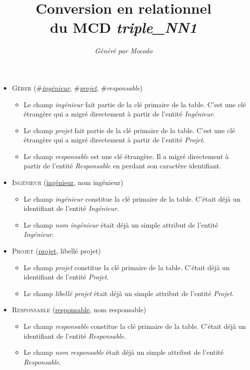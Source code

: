 \documentclass[a4paper]{article}
\title{Conversion en relationnel\\du MCD \emph{triple_NN1}}
\author{\emph{Généré par Mocodo}}
\newcommand{\relat}[1]{\textsc{#1}}
\newcommand{\attr}[1]{#1}
\newcommand{\prim}[1]{\uline{#1}}
\newcommand{\foreign}[1]{\#\textsl{#1}}
\begin{document}
\maketitle

\begin{itemize}
  \item \relat{Gérer} (\foreign{\prim{ingénieur}}, \foreign{\prim{projet}}, \foreign{responsable})
  \begin{itemize}
    \item Le champ \emph{ingénieur} fait partie de la clé primaire de la table. C'est une clé étrangère qui a migré directement à partir de l'entité \emph{Ingénieur}.
    \item Le champ \emph{projet} fait partie de la clé primaire de la table. C'est une clé étrangère qui a migré directement à partir de l'entité \emph{Projet}.
    \item Le champ \emph{responsable} est une clé étrangère. Il a migré directement à partir de l'entité \emph{Responsable} en perdant son caractère identifiant.
  \end{itemize}

  \item \relat{Ingénieur} (\prim{ingénieur}, \attr{nom ingénieur})
  \begin{itemize}
    \item Le champ \emph{ingénieur} constitue la clé primaire de la table. C'était déjà un identifiant de l'entité \emph{Ingénieur}.
    \item Le champ \emph{nom ingénieur} était déjà un simple attribut de l'entité \emph{Ingénieur}.
  \end{itemize}

  \item \relat{Projet} (\prim{projet}, \attr{libellé projet})
  \begin{itemize}
    \item Le champ \emph{projet} constitue la clé primaire de la table. C'était déjà un identifiant de l'entité \emph{Projet}.
    \item Le champ \emph{libellé projet} était déjà un simple attribut de l'entité \emph{Projet}.
  \end{itemize}

  \item \relat{Responsable} (\prim{responsable}, \attr{nom responsable})
  \begin{itemize}
    \item Le champ \emph{responsable} constitue la clé primaire de la table. C'était déjà un identifiant de l'entité \emph{Responsable}.
    \item Le champ \emph{nom responsable} était déjà un simple attribut de l'entité \emph{Responsable}.
  \end{itemize}

\end{itemize}
\end{document}
